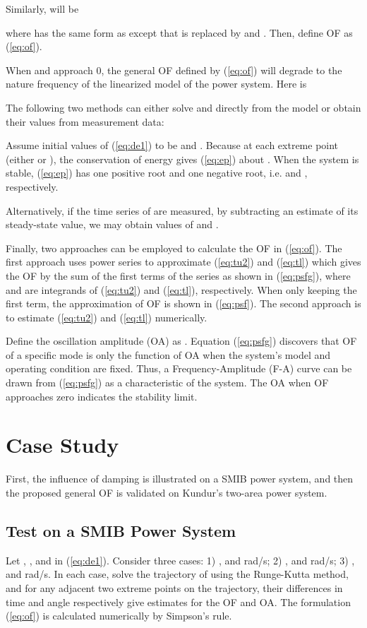 \documentclass[journal]{IEEEtran}
\begin{document}
Similarly,  will be

where  has the same form as  except that  is replaced by  and . Then, define OF  as (\ref{eq:of}).


When  and  approach 0, the general OF defined by (\ref{eq:of}) will degrade to the nature frequency of the linearized model of the power system. Here is


The following two methods can either solve  and  directly from the model or obtain their values from measurement data:

Assume initial values of (\ref{eq:de1}) to be  and . Because  at each extreme point  (either  or ), the conservation of energy gives (\ref{eq:ep}) about . When the system is stable, (\ref{eq:ep}) has one positive root and one negative root, i.e.  and , respectively.



Alternatively, if the time series of  are measured, by subtracting an estimate of its steady-state value, we may obtain values of  and .

Finally, two approaches can be employed to calculate the OF in (\ref{eq:of}). The first approach uses power series to approximate (\ref{eq:tu2}) and (\ref{eq:tl}) which gives the OF by the sum of the first  terms of the series as shown in (\ref{eq:psfg}), where  and  are integrands of (\ref{eq:tu2}) and (\ref{eq:tl}), respectively. When only keeping the first term, the approximation of OF is shown in (\ref{eq:psf}). The second approach is to estimate (\ref{eq:tu2}) and (\ref{eq:tl}) numerically.




Define the oscillation amplitude (OA) as . Equation (\ref{eq:psfg}) discovers that OF of a specific mode is only the function of OA when the system’s model and operating condition are fixed. Thus, a Frequency-Amplitude (F-A) curve can be drawn from (\ref{eq:psfg}) as a characteristic of the system. The OA when OF approaches zero indicates the stability limit.

\section{Case Study}
First, the influence of damping is illustrated on a SMIB power system, and then the proposed general OF is validated on Kundur's two-area power system\cite{kundur}.

\subsection{Test on a SMIB Power System}
Let , ,  and  in (\ref{eq:de1}). Consider three cases: 1) ,  and rad/s; 2) ,  and rad/s; 3) ,  and rad/s. In each case, solve the trajectory of  using the Runge-Kutta method, and for any adjacent two extreme points on the trajectory, their differences in time and angle respectively give estimates for the OF and OA. The formulation (\ref{eq:of}) is calculated numerically by Simpson's rule.
\end{document}
